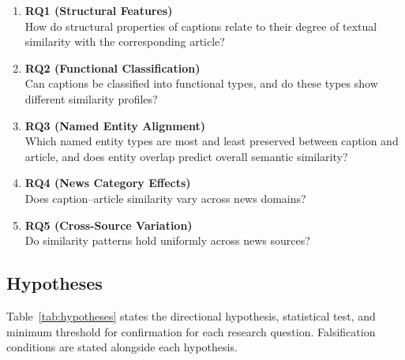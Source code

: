 \documentclass[11pt,a4paper]{article}
\begin{document}
\begin{enumerate}

\item \textbf{RQ1 (Structural Features)}\\
How do structural properties of captions relate to their degree of
textual similarity with the corresponding article?

\item \textbf{RQ2 (Functional Classification)}\\
Can captions be classified into functional types, and do these types show
different similarity profiles?

\item \textbf{RQ3 (Named Entity Alignment)}\\
Which named entity types are most and least preserved between caption and
article, and does entity overlap predict overall semantic similarity?

\item \textbf{RQ4 (News Category Effects)}\\
Does caption--article similarity vary across news domains?

\item \textbf{RQ5 (Cross-Source Variation)}\\
Do similarity patterns hold uniformly across news sources?

\end{enumerate}

\subsection{Hypotheses}

Table~\ref{tab:hypotheses} states the directional hypothesis, statistical
test, and minimum threshold for confirmation for each research question.
Falsification conditions are stated alongside each hypothesis.
\end{document}

